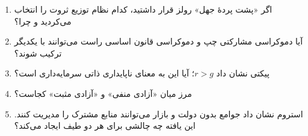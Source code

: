 \begin{questionbox}
\begin{enumerate}[leftmargin=*, itemsep=8pt]
  \item اگر «پشت پردهٔ جهل» رولز قرار داشتید،
        کدام نظام توزیع ثروت را انتخاب می‌کردید و چرا؟

  \item آیا دموکراسی مشارکتی چپ و دموکراسی قانون اساسی راست
        می‌توانند با یکدیگر ترکیب شوند؟

  \item پیکتی نشان داد $r > g$؛ آیا این به معنای
        ناپایداری ذاتی سرمایه‌داری است؟

  \item مرز میان «آزادی منفی» و «آزادی مثبت» کجاست؟

  \item استروم نشان داد جوامع بدون دولت و بازار می‌توانند
        منابع مشترک را مدیریت کنند.
        این یافته چه چالشی برای هر دو طیف ایجاد می‌کند؟
\end{enumerate}
\end{questionbox}